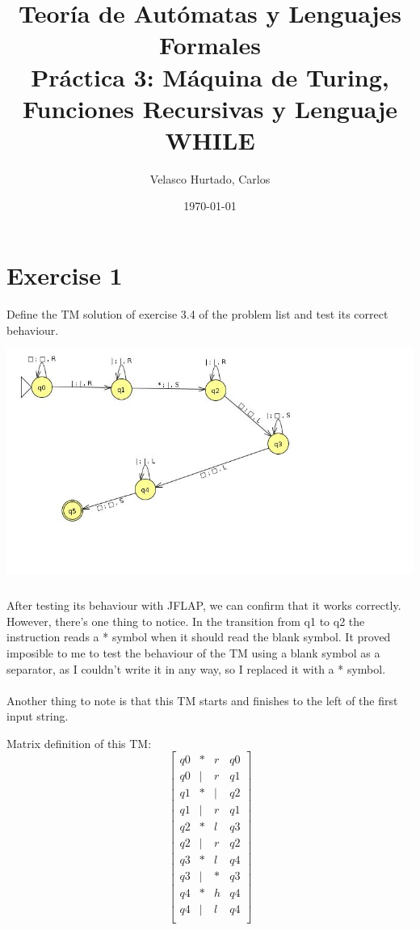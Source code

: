 \documentclass[11pt]{article}
\title{Teoría de Autómatas y Lenguajes Formales\\[.4\baselineskip]Práctica 3: Máquina de Turing, Funciones Recursivas y Lenguaje WHILE}
\author{Velasco Hurtado, Carlos}
\date{\today}
\begin{document}
\maketitle
\thispagestyle{empty}

\section{Exercise 1}
Define the TM solution of exercise 3.4 of the problem list and test its correct behaviour.
\\

\includegraphics[height=8cm]{MT-suma.jpg}

After testing its behaviour with JFLAP, we can confirm that it works correctly. However, there's one thing to notice. In the transition from q1 to q2 the instruction reads a * symbol when it should read the blank symbol. It proved imposible to me to test the behaviour of the TM using a blank symbol as a separator, as I couldn't write it in any way, so I replaced it with a * symbol.
\\\\
Another thing to note is that this TM starts and finishes to the left of the first input string.

\newpage
Matrix definition of this TM:
\[
\begin{bmatrix}
    q0 & * & r & q0 \\
    q0 & | & r & q1 \\
    q1 & * & | & q2 \\
    q1 & | & r & q1 \\
    q2 & * & l & q3 \\
    q2 & | & r & q2 \\
    q3 & * & l & q4 \\
    q3 & | & * & q3 \\
    q4 & * & h & q4 \\
    q4 & | & l & q4 \\
\end{bmatrix}
\]\\
\end{document}
